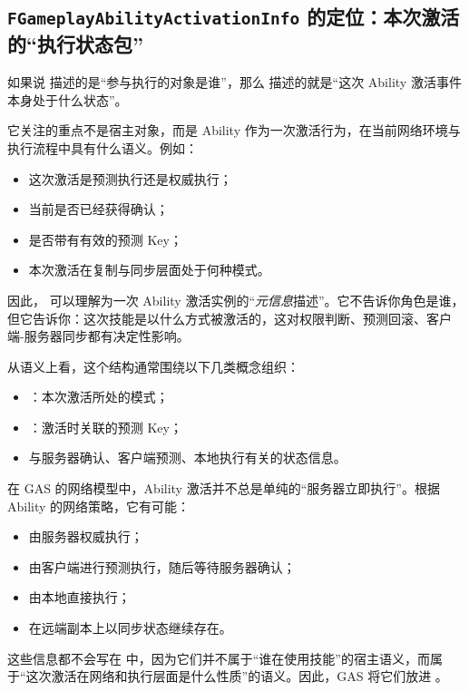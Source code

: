 \subsection{\texttt{FGameplayAbilityActivationInfo} 的定位：本次激活的“执行状态包”}
如果说  描述的是“参与执行的对象是谁”，那么  描述的就是“这次 Ability 激活事件本身处于什么状态”。

它关注的重点不是宿主对象，而是 Ability 作为一次激活行为，在当前网络环境与执行流程中具有什么语义。例如：

\begin{itemize}
	\item 这次激活是预测执行还是权威执行；
	\item 当前是否已经获得确认；
	\item 是否带有有效的预测 Key；
	\item 本次激活在复制与同步层面处于何种模式。
\end{itemize}

因此， 可以理解为一次 Ability 激活实例的“\emph{元信息}描述”。它不告诉你角色是谁，但它告诉你：这次技能是以什么方式被激活的，这对权限判断、预测回滚、客户端-服务器同步都有决定性影响。

从语义上看，这个结构通常围绕以下几类概念组织：

\begin{itemize}
	\item {}：本次激活所处的模式；
	\item {}：激活时关联的预测 Key；
	\item 与服务器确认、客户端预测、本地执行有关的状态信息。
\end{itemize}

在 GAS 的网络模型中，Ability 激活并不总是单纯的“服务器立即执行”。根据 Ability 的网络策略，它有可能：

\begin{itemize}
	\item 由服务器权威执行；
	\item 由客户端进行预测执行，随后等待服务器确认；
	\item 由本地直接执行；
	\item 在远端副本上以同步状态继续存在。
\end{itemize}

这些信息都不会写在  中，因为它们并不属于“谁在使用技能”的宿主语义，而属于“这次激活在网络和执行层面是什么性质”的语义。因此，GAS 将它们放进 。

